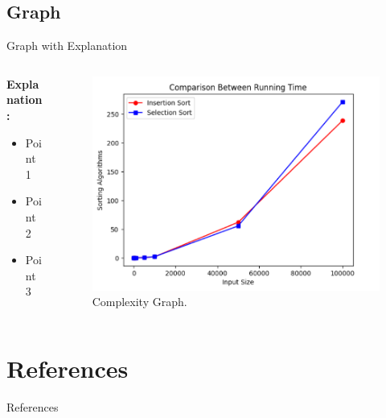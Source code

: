 \documentclass{beamer}
\begin{document}
\subsection{Graph}
\begin{frame}{Graph with Explanation}
  \begin{columns}
    \begin{column}{0.5\textwidth}
      \textbf{Explanation:}
      \begin{itemize}
        \item Point 1
        \item Point 2
        \item Point 3
      \end{itemize}
    \end{column}
    \begin{column}{0.5\textwidth}
      \begin{figure}
        \centering
        \includegraphics[width=\textwidth]{table1.png} %
        \caption{Complexity Graph.}
      \end{figure}
    \end{column}
  \end{columns}
\end{frame}

\section{References}
\begin{frame}[shrink=20]{References}
    \nocite{*} 
    
    
\end{frame}
\end{document}
